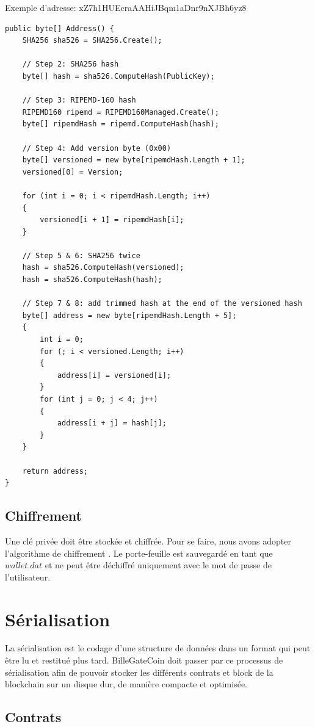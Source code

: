 \documentclass{article}
\begin{document}
Exemple d'adresse: xZ7h1HUEcraAAHiJBqm1aDnr9nXJBh6yz8
\filbreak
\begin{verbatim}
public byte[] Address() {
    SHA256 sha526 = SHA256.Create();

    // Step 2: SHA256 hash
    byte[] hash = sha526.ComputeHash(PublicKey);

    // Step 3: RIPEMD-160 hash
    RIPEMD160 ripemd = RIPEMD160Managed.Create();
    byte[] ripemdHash = ripemd.ComputeHash(hash);
    
    // Step 4: Add version byte (0x00)
    byte[] versioned = new byte[ripemdHash.Length + 1];
    versioned[0] = Version;
    
    for (int i = 0; i < ripemdHash.Length; i++)
    {
        versioned[i + 1] = ripemdHash[i];
    }

    // Step 5 & 6: SHA256 twice
    hash = sha526.ComputeHash(versioned);
    hash = sha526.ComputeHash(hash);
    
    // Step 7 & 8: add trimmed hash at the end of the versioned hash
    byte[] address = new byte[ripemdHash.Length + 5];
    {
        int i = 0;
        for (; i < versioned.Length; i++)
        {
            address[i] = versioned[i];
        }
        for (int j = 0; j < 4; j++)
        {
            address[i + j] = hash[j];
        }
    }

    return address;
}
\end{verbatim}

\subsection{Chiffrement}
Une clé privée doit être stockée et chiffrée. Pour se faire, nous avons adopter l'algorithme de chiffrement . Le porte-feuille est sauvegardé en tant que $wallet.dat$ et ne peut être déchiffré uniquement avec le mot de passe de l'utilisateur.

\section{Sérialisation}
La sérialisation est le codage d'une structure de données dans un format qui peut être lu et restitué plus tard. BilleGateCoin doit passer par ce processus de sérialisation afin de pouvoir stocker les différents contrats et block de la blockchain sur un disque dur, de manière compacte et optimisée.

\subsection{Contrats}
\end{document}
